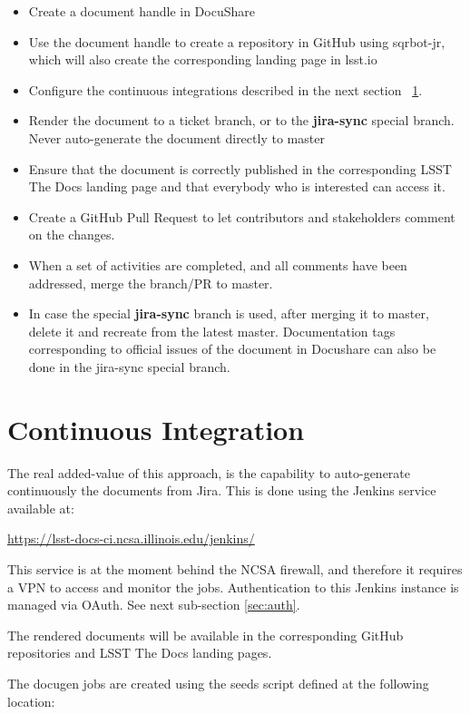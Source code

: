 \begin{itemize}
\item Create a document handle in DocuShare
\item Use the document handle to create a repository in GitHub using sqrbot-jr, which will also create the corresponding landing page in lsst.io
\item Configure the continuous integrations described in the next section ~\ref{sec:ci}.
\item Render the document to a ticket branch, or to the \textbf{jira-sync} special branch. Never auto-generate the document directly to master
\item Ensure that the document is correctly published in the corresponding LSST The Docs landing page and that everybody who is interested can access it.
\item Create a GitHub Pull Request to let contributors and stakeholders comment on the changes.
\item When a set of activities are completed, and all comments have been addressed, merge the branch/PR to master.
\item In case the special \textbf{jira-sync} branch is used, after merging it to master, delete it  and recreate from the latest master. Documentation tags corresponding to official issues of the document in Docushare can also be done in the jira-sync special branch.
\end{itemize}



\section{Continuous Integration}\label{sec:ci}

The real added-value of this approach, is the capability to auto-generate continuously the documents from Jira.
This is done using the Jenkins service available at:

\url{https://lsst-docs-ci.ncsa.illinois.edu/jenkins/}

This service is at the moment behind the NCSA firewall, and therefore it requires a VPN to access and monitor the jobs.
Authentication to this Jenkins instance is managed via OAuth. See next sub-section \ref{sec:auth}.

The rendered documents will be available in the corresponding GitHub repositories and LSST The Docs landing pages.

The docugen jobs are created using the seeds script defined at the following location:

